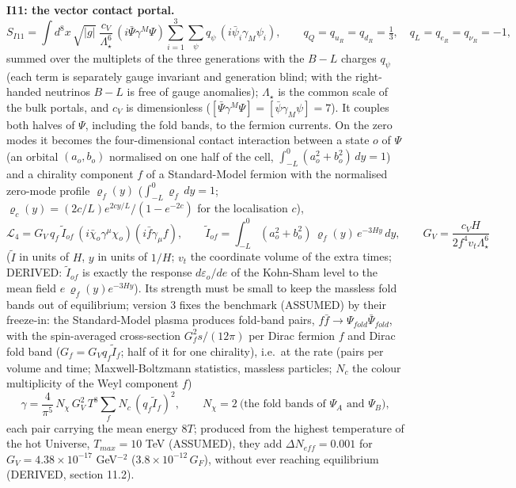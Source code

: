 \documentclass[
  10pt,
]{article}
\begin{document}
\textbf{I11: the vector contact portal.}
\[ S_{I11} = \int d^8x\,\sqrt{|g|}\;\frac{c_V}{\Lambda_\star^{6}}\,(i\bar\Psi\gamma^M\Psi)\sum_{i=1}^{3}\sum_{\psi}q_\psi\,(i\bar\psi_i\gamma_M\psi_i),\qquad
   q_Q = q_{u_R} = q_{d_R} = \tfrac13,\quad q_L = q_{e_R} = q_{\nu_R} = -1, \]
summed over the multiplets of the three generations with the \(B - L\)
charges \(q_\psi\) (each term is separately gauge invariant and
generation blind; with the right-handed neutrinos \(B - L\) is free of
gauge anomalies); \(\Lambda_\star\) is the common scale of the bulk
portals, and \(c_V\) is dimensionless
(\([\bar\Psi\gamma^M\Psi] = [\bar\psi\gamma_M\psi] = 7\)). It couples
both halves of \(\Psi\), including the fold bands, to the fermion
currents. On the zero modes it becomes the four-dimensional contact
interaction between a state \(o\) of \(\Psi\) (an orbital \((a_o, b_o)\)
normalised on one half of the cell,
\(\int_{-L}^{0}(a_o^2 + b_o^2)\,dy = 1\)) and a chirality component
\(f\) of a Standard-Model fermion with the normalised zero-mode profile
\(\varrho_f(y)\) (\(\int_{-L}^0\varrho_f\,dy = 1\);
\(\varrho_c(y) = (2c/L)e^{2cy/L}/(1 - e^{-2c})\) for the localisation
\(c\)),
\[ \mathcal L_4 = G_V\,q_f\,\tilde I_{of}\,(i\bar\chi_o\gamma^\mu\chi_o)(i\bar f\gamma_\mu f),\qquad \tilde I_{of} = \int_{-L}^{0}(a_o^2 + b_o^2)\,\varrho_f(y)\,e^{-3Hy}\,dy,\qquad
   G_V = \frac{c_VH}{2f^4v_t\Lambda_\star^6} \] (\(\tilde I\) in units
of \(H\), \(y\) in units of \(1/H\); \(v_t\) the coordinate volume of
the extra times; DERIVED: \(\tilde I_{of}\) is exactly the response
\(d\varepsilon_o/de\) of the Kohn-Sham level to the mean field
\(e\,\varrho_f(y)e^{-3Hy}\)). Its strength must be small to keep the
massless fold bands out of equilibrium; version 3 fixes the benchmark
(ASSUMED) by their freeze-in: the Standard-Model plasma produces
fold-band pairs, \(f\bar f \to \Psi_{fold}\bar\Psi_{fold}\), with the
spin-averaged cross-section \(G_f^2s/(12\pi)\) per Dirac fermion \(f\)
and Dirac fold band (\(G_f = G_Vq_f\tilde I_f\); half of it for one
chirality), i.e.~at the rate (pairs per volume and time;
Maxwell-Boltzmann statistics, massless particles; \(N_c\) the colour
multiplicity of the Weyl component \(f\))
\[ \gamma = \frac{4}{\pi^5}\,N_\chi\,G_V^2\,T^8\sum_fN_c\,(q_f\tilde I_f)^2,\qquad N_\chi = 2\ \text{(the fold bands of }\Psi_A\text{ and }\Psi_B), \]
each pair carrying the mean energy \(8T\); produced from the highest
temperature of the hot Universe, \(T_{max} = 10\) TeV (ASSUMED), they
add \(\Delta N_{eff} = 0.001\) for \(G_V = 4.38\times10^{-17}\)
GeV\(^{-2}\) (\(3.8\times10^{-12}\,G_F\)), without ever reaching
equilibrium (DERIVED, section 11.2).
\end{document}
